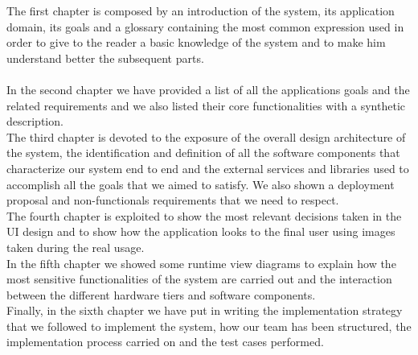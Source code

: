 The first chapter is composed by an introduction of the system, its application domain, its goals and a glossary containing the most common expression used in order to give to the reader a basic knowledge of the system and to make him understand better the subsequent parts.\\\\
In the second chapter we have provided a list of all the applications goals and the related requirements and we also listed their core functionalities with a synthetic description.\\

The third chapter is devoted to the exposure of the overall design architecture of the system, the identification and definition of all the software components that characterize our system end to end and the external services and libraries used to accomplish all the goals that we aimed to satisfy. We also shown a deployment proposal and non-functionals requirements that we need to respect.\\

The fourth chapter is exploited to show the most relevant decisions taken in the UI design and to show how the application looks to the final user using images taken during the real usage.\\

In the fifth chapter we showed some runtime view diagrams to explain how the most sensitive functionalities of the system are carried out and the interaction between the different hardware tiers and software components.\\

Finally, in the sixth chapter we have put in writing the implementation strategy that we followed to implement the system, how our team has been structured, the implementation process carried on and the test cases performed. 
	
	
	
